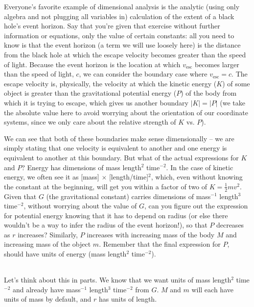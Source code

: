 Everyone's favorite example of dimensional analysis is the analytic (using only algebra and not plugging all variables in) calculation of the extent of a black hole's event horizon. Say that you're given that exercise without further information or equations, only the value of certain constants: all you need to know is that the event horizon (a term we will use loosely here) is the distance from the black hole at which the escape velocity becomes greater than the speed of light. Because the event horizon is the location at which $v_\mathrm{esc}$ becomes larger than the speed of light, $c$, we can consider the boundary case where $v_\mathrm{esc} = c$. The escape velocity is, physically, the velocity at which the kinetic energy ($K$) of some object is greater than the gravitational potential energy ($P$) of the body from which it is trying to escape, which gives us another boundary $|K| = |P|$ (we take the absolute value here to avoid worrying about the orientation of our coordinate systems, since we only care about the relative strength of $K$ vs. $P$).

We can see that both of these boundaries make sense dimensionally -- we are simply stating that one velocity is equivalent to another and one energy is equivalent to another at this boundary. But what of the actual expressions for $K$ and $P$? Energy has dimensions of mass length$^2$ time$^{-2}$. In the case of kinetic energy, we often see it as [mass] $\times$ [length/time]$^{2}$, which, even without knowing the constant at the beginning, will get you within a factor of two of $K = \frac{1}{2}mv^2$. Given that $G$ (the gravitational constant) carries dimensions of mass$^{-1}$ length$^3$ time$^{-2}$, without worrying about the value of $G$, can you figure out the expression for potential energy knowing that it has to depend on radius (or else there wouldn't be a way to infer the radius of the event horizon!), so that $P$ decreases as $r$ increases? Similarly, $P$ increases with increasing mass of the body $M$ and increasing mass of the object $m$.  Remember that the final expression for $P$, should have units of energy (mass length$^2$ time$^{-2}$).\\
\\
\vfill

\pagebreak

Let's think about this in parts. We know that we want units of mass length$^2$ time$^{-2}$ and already have mass$^{-1}$ length$^3$ time$^{-2}$ from $G$. $M$ and $m$ will each have units of mass by default, and $r$ has units of length.

